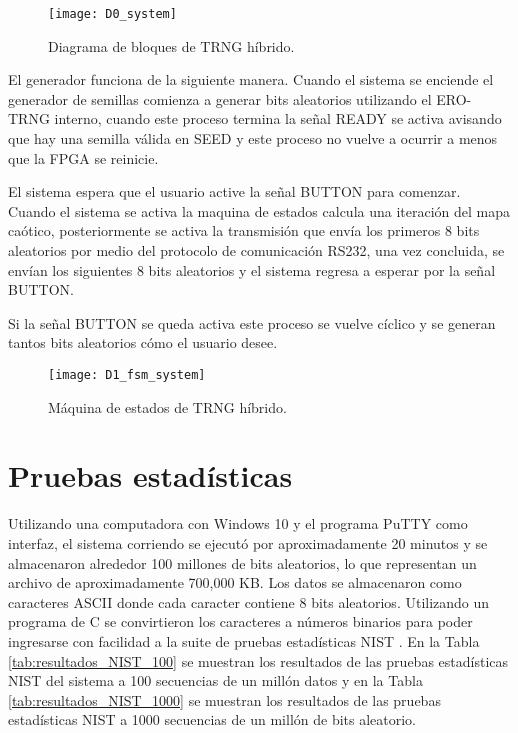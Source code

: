          \begin{figure}[hbtp]
            \centering
            \texttt{[image: D0\_system]}
            \caption{Diagrama de bloques de TRNG híbrido.}
            \label{fig:D0_system}
        \end{figure}

        El generador funciona de la siguiente manera. Cuando el sistema se enciende el generador de semillas comienza a generar bits aleatorios utilizando el ERO-TRNG interno, cuando este proceso termina la señal READY se activa avisando que hay una semilla válida en SEED y este proceso no vuelve a ocurrir a menos que la FPGA se reinicie.

       El sistema espera que el usuario active la señal BUTTON para comenzar. Cuando el sistema se activa la maquina de estados calcula una iteración del mapa caótico, posteriormente se activa la transmisión que envía los primeros 8 bits aleatorios por medio del protocolo de comunicación RS232, una vez concluida, se envían los siguientes 8 bits aleatorios y el sistema regresa a esperar por la señal BUTTON. 

       Si la señal BUTTON se queda activa este proceso se vuelve cíclico y se generan tantos bits aleatorios cómo el usuario desee.

       \begin{figure}[hbtp]
            \centering
            \texttt{[image: D1\_fsm\_system]}
            \caption{Máquina de estados de TRNG híbrido.}
            \label{fig:D1_fsm_system}
        \end{figure}

        \section{Pruebas estadísticas}

        Utilizando una computadora con Windows 10 y el programa PuTTY como interfaz, el sistema corriendo se ejecutó por aproximadamente 20 minutos y se almacenaron alrededor 100 millones de bits aleatorios, lo que representan un archivo de aproximadamente 700,000 KB. Los datos se almacenaron como caracteres ASCII donde cada caracter contiene 8 bits aleatorios. Utilizando un programa de C se convirtieron los caracteres a números binarios para poder ingresarse con facilidad a la suite de pruebas estadísticas NIST \cite{Nist2010,Turan2018}. En la Tabla \ref{tab:resultados_NIST_100} se muestran los resultados de las pruebas estadísticas NIST del sistema a 100 secuencias de un millón datos y en la Tabla \ref{tab:resultados_NIST_1000} se muestran los resultados de las pruebas estadísticas NIST a 1000 secuencias de un millón de bits aleatorio.

